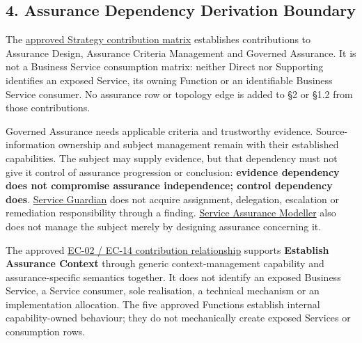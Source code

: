 \par\smallskip
{}\label{rad:dependencies:93}
\subsection*{4. Assurance Dependency Derivation Boundary}
\label{rad:dependencies:95}

The \hyperref[rad:assurance-strategy:54]{approved Strategy contribution matrix} establishes contributions to Assurance Design, Assurance Criteria Management and Governed Assurance. It is not a Business Service consumption matrix: neither Direct nor Supporting identifies an exposed Service, its owning Function or an identifiable Business Service consumer. No assurance row or topology edge is added to §2 or §1.2 from those contributions.

\label{rad:dependencies:97}

Governed Assurance needs applicable criteria and trustworthy evidence. Source-information ownership and subject management remain with their established capabilities. The subject may supply evidence, but that dependency must not give it control of assurance progression or conclusion: \textbf{evidence dependency does not compromise assurance independence; control dependency does}. \href{https://github.com/fhirfactory/harmonia/blob/98410db60155198a75f74c79d98060070209faa1/docs/markdown/03-business-architecture/actors-roles/roles.md\#service-guardian}{Service Guardian} does not acquire assignment, delegation, escalation or remediation responsibility through a finding. \href{https://github.com/fhirfactory/harmonia/blob/98410db60155198a75f74c79d98060070209faa1/docs/markdown/03-business-architecture/actors-roles/roles.md\#service-assurance-modeller}{Service Assurance Modeller} also does not manage the subject merely by designing assurance concerning it.

\label{rad:dependencies:99}

The approved \hyperref[rad:assurance:138]{EC-02 /\allowbreak{} EC-14 contribution relationship} supports \textbf{Establish Assurance Context} through generic context-management capability and assurance-specific semantics together. It does not identify an exposed Business Service, a Service consumer, sole realisation, a technical mechanism or an implementation allocation. The five approved Functions establish internal capability-owned behaviour; they do not mechanically create exposed Services or consumption rows.

